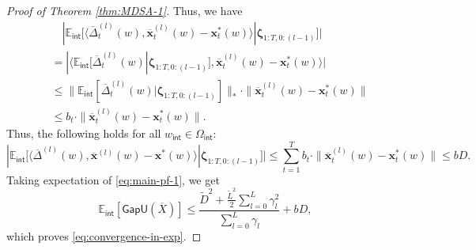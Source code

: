 \documentclass[11pt,fullpage,letterpaper]{article}
\newcommand{\mb}{\mathbf}
\newcommand{\E}{\mathbb{E}}
\newcommand{\p}{\mathbb{P}}
\newcommand{\bz}{\boldsymbol{\zeta}}
\newcommand{\internal}{\mathsf{int}}
\newcommand{\gapu}{\mathsf{GapU}}
\begin{document}
\begin{proof}[Proof of Theorem \ref{thm:MDSA-1}]
Thus, we have
\begin{align*}
    &\quad|\E_{\internal}[\langle \overline{\Delta}_{t}^{(l)}(w),\overline{\mb x}_{t}^{(l)}(w)-\mb x^*_{t}(w)\rangle|\bz_{1:T,0:(l-1)}]| \\
    &= |\langle \E_{\internal}[\overline{\Delta}_{t}^{(l)}(w)|\bz_{1:T,0:(l-1)}],\overline{\mb x}_{t}^{(l)}(w)-\mb x^*_{t}(w)\rangle|\\
    &\leq  \|\E_{\internal}[\overline{\Delta}_{t}^{(l)}(w)|\bz_{1:T,0:(l-1)}]\|_*\cdot \|\overline{\mb x}_{t}^{(l)}(w)-\mb x^*_{t}(w)\|\\
    &\leq b_t\cdot \|\overline{\mb x}_{t}^{(l)}(w)-\mb x^*_{t}(w)\|.
\end{align*}
Thus, the following holds for all $w_{\internal}\in \Omega_{\internal}$:
\begin{displaymath}
    |\E_{\internal}[\langle \overline{\Delta}^{(l)}(w),\overline{\mb x}^{(l)}(w)-\mb x^*(w)\rangle|\bz_{1:T,0:(l-1)}] |\leq \sum_{t=1}^Tb_t\cdot \|\overline{\mb x}_{t}^{(l)}(w)-\mb x^*_{t}(w)\| \leq bD. 
\end{displaymath}
Taking expectation of \eqref{eq:main-pf-1}, we get 
\begin{displaymath}
        \E_{\internal}[\gapu(\overline{X})] \leq \frac{\tilde{D}^2 + \frac{\tilde{L}^2}{2}\sum_{l=0}^L \gamma_l^2  }{\sum_{l=0}^L \gamma_l}+bD,
   \end{displaymath}
which proves \eqref{eq:convergence-in-exp}. 



\end{proof}
\end{document}
